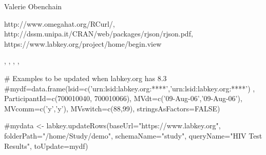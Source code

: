 \documentclass{article}
\begin{document}
\begin{Author}\relax
Valerie Obenchain
\end{Author}
\begin{References}\relax
http://www.omegahat.org/RCurl/, \\
http://dssm.unipa.it/CRAN/web/packages/rjson/rjson.pdf,\\
https://www.labkey.org/project/home/begin.view
\end{References}
\begin{SeeAlso}\relax
{}, , , 
, 
\end{SeeAlso}
\begin{Examples}
\begin{ExampleCode}

# Examples to be updated when labkey.org has 8.3
#mydf=data.frame(lsid=c('urn:lsid:labkey.org:****','urn:lsid:labkey.org:****') , ParticipantId=c(700010040, 700010066), MVdt=c('09-Aug-06','09-Aug-06'), MVcomm=c('y','y'), MVswitch=c(88,99), stringsAsFactors=FALSE)

#mydata <- labkey.updateRows(baseUrl="https://www.labkey.org", folderPath="/home/Study/demo", schemaName="study", queryName="HIV Test Results", toUpdate=mydf)


\end{ExampleCode}
\end{Examples}
\end{document}
